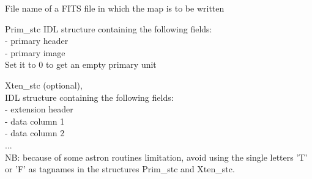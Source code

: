 \begin{qualifiers}
  \begin{qulist}{} %
 	\item[{File}] 
          name of a FITS file in which the map is to be written

 	\item[{Prim\_stc}]  
	IDL structure containing the following fields: \\
		- primary header \\
		- primary image \\
	Set it to 0 to get an empty primary unit

       \item[{Xten\_stc}]  
		  (optional), \\
	IDL structure containing the following fields: \\
		- extension header  \\
		- data column 1  \\
		- data column 2   \\
		... \\
	NB: because of some astron routines limitation, avoid using the single letters
		  'T' or 'F' as tagnames in the structures Prim\_stc and Xten\_stc.

  \end{qulist}
\end{qualifiers}

